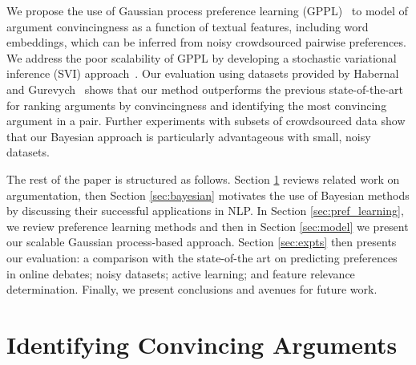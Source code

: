 We propose the use of Gaussian process preference learning (GPPL)~\cite{chu2005preference} 
to model of argument convincingness as a function of textual features, including word embeddings,
which can be inferred from noisy crowdsourced pairwise preferences.
We address the poor scalability of GPPL by developing a stochastic variational inference (SVI) approach~\cite{hoffman2013stochastic}.
Our evaluation using datasets provided by Habernal and Gurevych~
shows that our method outperforms the previous state-of-the-art for ranking arguments by convincingness and 
identifying the most convincing argument in a pair. 
Further experiments with subsets of crowdsourced data show that our Bayesian approach is particularly advantageous with small, noisy datasets.

The rest of the paper is structured as follows.
Section \ref{sec:related} reviews related work on argumentation,
then Section \ref{sec:bayesian} motivates the use of Bayesian methods by discussing their successful applications in NLP.
In Section \ref{sec:pref_learning}, we review preference learning methods and then in Section \ref{sec:model}
we present our scalable Gaussian process-based approach.
Section \ref{sec:expts} then presents our evaluation: 
a comparison with the state-of-the art on predicting preferences in online debates; 
noisy datasets; active learning; and feature relevance determination.
Finally, we present conclusions and avenues for future work.

\section{Identifying Convincing Arguments}\label{sec:related}

